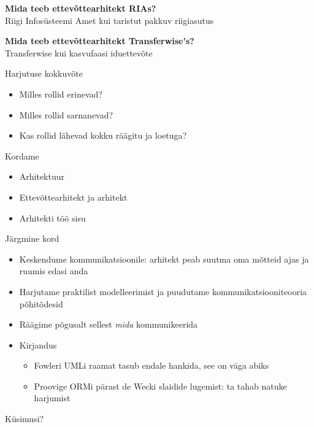 \documentclass{beamer}
\begin{document}
\begin{frame}[fragile]
	\begin{center}
		\LARGE{\textbf{Mida teeb ettevõttearhitekt RIAs?}}
		\\[4cm]
		\small{Riigi Infosüsteemi Amet kui taristut pakkuv riigiasutus}
	\end{center}
\end{frame}

\begin{frame}[fragile]
	\begin{center}
		\LARGE{\textbf{Mida teeb ettevõttearhitekt Transferwise's?}}
		\\[4cm]
		\small{Transferwise kui kasvufaasi iduettevõte}
	\end{center}
\end{frame}

\begin{frame}{Harjutuse kokkuvõte}
	\begin{itemize}
		\item Milles rollid erinevad?
		\item Milles rollid sarnanevad?
		\item Kas rollid lähevad kokku räägitu ja loetuga?
	\end{itemize}
\end{frame}

\begin{frame}{Kordame}
	\begin{itemize}
		\item Arhitektuur
		\item Ettevõttearhitekt ja arhitekt
		\item Arhitekti töö sisu
	\end{itemize}
\end{frame}

\begin{frame}{Järgmine kord}
\begin{itemize}
	\item Keskendume kommunikatsioonile: arhitekt peab suutma oma mõtteid ajas ja ruumis edasi anda
	\item Harjutame praktilist modelleerimist ja puudutame kommunikatsiooniteooria põhitõdesid
	\item Räägime põgusalt sellest \emph{mida} kommunikeerida
	\item Kirjandus
	\begin{itemize}
		\item Fowleri UMLi raamat tasub endale hankida, see on väga abiks
		\item Proovige ORMi pärast de Wecki slaidide lugemist: ta tahab natuke harjumist
	\end{itemize}
	\end{itemize}
\end{frame}
\begin{frame}[standout]
Küsimusi?
\end{frame}
\end{document}
